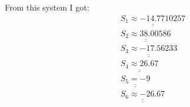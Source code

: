 \documentclass[a4paper,11pt,oneside,article]{memoir}
\def\doubleunderline#1{\underline{\underline{#1}}}
\begin{document}
From this system I got:
\begin{equation}
    \begin{split}
    \doubleunderline{S_1 \approx -14.7710257}\\
    \doubleunderline{S_2 \approx 38.00586}\\
    \doubleunderline{S_3 \approx -17.56233}\\
    \doubleunderline{S_4 \approx 26.67}\\
    \doubleunderline{S_5  = -9}\\
    \doubleunderline{S_6 \approx -26.67}\\
     \end{split}
\end{equation}
\end{document}
